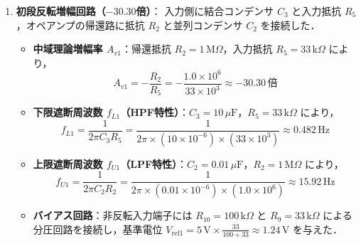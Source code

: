 \begin{enumerate}
  \item \textbf{初段反転増幅回路（$-30.30$倍）}：
        入力側に結合コンデンサ $C_3$ と入力抵抗 $R_5$，オペアンプの帰還路に抵抗 $R_2$ と並列コンデンサ $C_2$ を接続した．
        \begin{itemize}
          \item \textbf{中域理論増幅率 $A_{v1}$}：帰還抵抗 $R_2 = 1\,\mathrm{M}\Omega$，入力抵抗 $R_5 = 33\,\mathrm{k}\Omega$ により，
                \begin{equation}
                  A_{v1} = -\frac{R_2}{R_5} = -\frac{1.0 \times 10^6}{33 \times 10^3} \approx -30.30\,\text{倍}
                  \label{eq:gain1}
                \end{equation}
          \item \textbf{下限遮断周波数 $f_{L1}$（HPF特性）}：$C_3 = 10\,\mu\mathrm{F}$，$R_5 = 33\,\mathrm{k}\Omega$ により，
                \begin{equation}
                  f_{L1} = \frac{1}{2\pi C_3 R_5} = \frac{1}{2\pi \times (10 \times 10^{-6}) \times (33 \times 10^3)} \approx 0.482\,\mathrm{Hz}
                  \label{eq:fl1}
                \end{equation}
          \item \textbf{上限遮断周波数 $f_{U1}$（LPF特性）}：$C_2 = 0.01\,\mu\mathrm{F}$，$R_2 = 1\,\mathrm{M}\Omega$ により，
                \begin{equation}
                  f_{U1} = \frac{1}{2\pi C_2 R_2} = \frac{1}{2\pi \times (0.01 \times 10^{-6}) \times (1.0 \times 10^6)} \approx 15.92\,\mathrm{Hz}
                  \label{eq:fu1}
                \end{equation}
          \item \textbf{バイアス回路}：非反転入力端子には $R_{10} = 100\,\mathrm{k}\Omega$ と $R_9 = 33\,\mathrm{k}\Omega$ による分圧回路を接続し，基準電位 $V_{\mathrm{ref1}} = 5\,\mathrm{V} \times \frac{33}{100 + 33} \approx 1.24\,\mathrm{V}$ を与えた．
        \end{itemize}


\end{enumerate}
